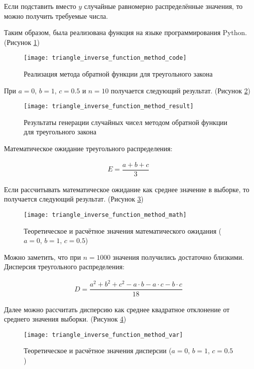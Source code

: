 Если подставить вместо $y$ случайные равномерно распределённые значения, то можно получить требуемые числа.

Таким образом, была реализована функция на языке программирования Python. (Рисунок \ref{fig:triangle_inverse_function_method_code})
\begin{figure}[h]
	\centering \texttt{[image: triangle\_inverse\_function\_method\_code]}
	\caption{Реализация метода обратной функции для треугольного закона}
	\label{fig:triangle_inverse_function_method_code}
\end{figure}

При $a = 0$, $b = 1$, $c = 0.5$ и $n = 10$ получается следующий результат. (Рисунок \ref{fig:triangle_inverse_function_method_result})
\begin{figure}[h]
	\centering \texttt{[image: triangle\_inverse\_function\_method\_result]}
	\caption{Результаты генерации случайных чисел методом обратной функции для треугольного закона}
	\label{fig:triangle_inverse_function_method_result}
\end{figure}

Математическое ожидание треугольного распределения:
\begin{ceqn}
	\begin{align*}
		E = \dfrac{a + b + c}{3}
	\end{align*}
\end{ceqn}
\newpage
Если рассчитывать математическое ожидание как среднее значение в выборке, то получается следующий результат. (Рисунок \ref{fig:triangle_inverse_function_method_math})
\begin{figure}[h]
	\centering \texttt{[image: triangle\_inverse\_function\_method\_math]}
	\caption{Теоретическое и расчётное значения математического ожидания ($a = 0$, $b = 1$, $c = 0.5$)}
	\label{fig:triangle_inverse_function_method_math}
\end{figure}

Можно заметить, что при $n = 1000$ значения получились достаточно близкими.\\
Дисперсия треугольного распределения:
\begin{ceqn}
	\begin{align*}
		D = \dfrac{a^2 + b^2 +c^2 - a \cdot b - a \cdot c - b \cdot c}{18}
	\end{align*}
\end{ceqn}
Далее можно рассчитать дисперсию как среднее квадратное отклонение от среднего значения выборки. (Рисунок \ref{fig:triangle_inverse_function_method_var})
\begin{figure}[h]
	\centering \texttt{[image: triangle\_inverse\_function\_method\_var]}
	\caption{Теоретическое и расчётное значения дисперсии ($a = 0$, $b = 1$, $c = 0.5$)}
	\label{fig:triangle_inverse_function_method_var}
\end{figure}

